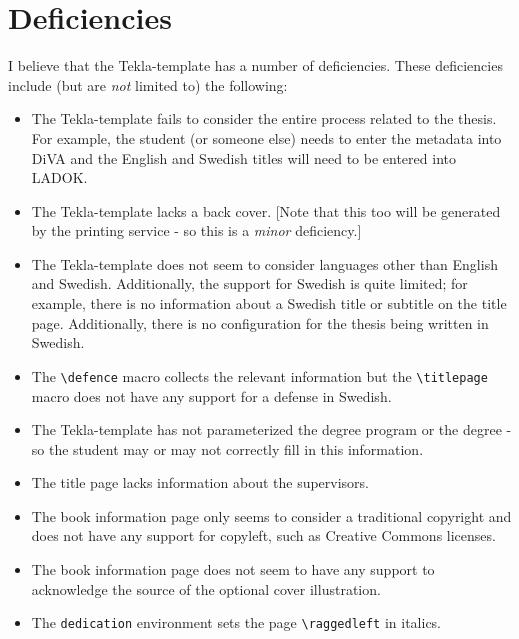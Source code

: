 \documentclass[12pt, twoside]{article}
\begin{document}
\section{Deficiencies}

I believe that the Tekla-template has a number of deficiencies. These deficiencies include (but are \textit{not} limited to) the following:

\begin{itemize}[label=\color{red}]
  \item The Tekla-template fails to consider the entire process related to the thesis. For example, the student (or someone else) needs to enter the metadata into DiVA and the English and Swedish titles will need to be entered into LADOK.

  \item The Tekla-template lacks a back cover. [Note that this too will be generated by the printing service - so this is a \textit{minor} deficiency.]

  \item The Tekla-template does not seem to consider languages other than English and Swedish. Additionally, the support for Swedish is quite limited; for example, there is no information about a Swedish title or subtitle on the title page. Additionally, there is no configuration for the thesis being written in Swedish.

  \item The \texttt{\textbackslash defence} macro collects the relevant information but the \texttt{\textbackslash titlepage} macro does not have any support for a defense in Swedish.

  \item The Tekla-template has not parameterized the degree program or the degree - so the student may or may not correctly fill in this information.

  \item The title page lacks information about the supervisors.

  \item The book information page only seems to consider a traditional
    copyright and does not have any support for copyleft, such as Creative Commons licenses.

  \item The book information page does not seem to have any support to
    acknowledge the source of the optional cover illustration.

  \item The \texttt{dedication} environment sets the page \texttt{\textbackslash raggedleft} in italics.


\end{itemize}
\end{document}
